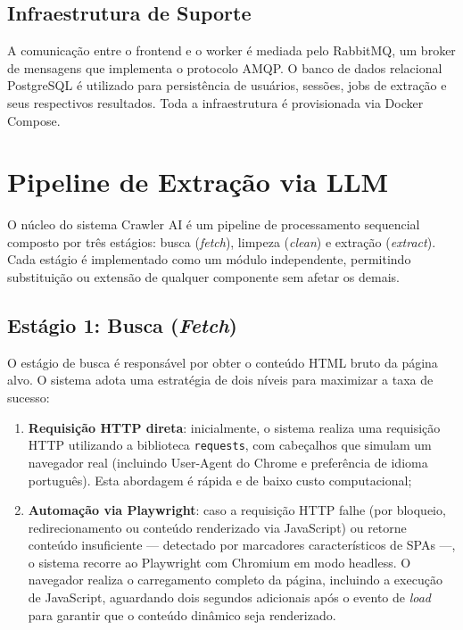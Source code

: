 \documentclass[tcc,capa]{texifsul}
\begin{document}
\subsection{Infraestrutura de Suporte}

A comunicação entre o frontend e o worker é mediada pelo RabbitMQ, um broker de mensagens que implementa o protocolo AMQP. O banco de dados relacional PostgreSQL é utilizado para persistência de usuários, sessões, jobs de extração e seus respectivos resultados. Toda a infraestrutura é provisionada via Docker Compose.

\section{Pipeline de Extração via LLM}
\label{sec:pipeline}

O núcleo do sistema Crawler AI é um pipeline de processamento sequencial composto por três estágios: busca (\textit{fetch}), limpeza (\textit{clean}) e extração (\textit{extract}). Cada estágio é implementado como um módulo independente, permitindo substituição ou extensão de qualquer componente sem afetar os demais.

\subsection{Estágio 1: Busca (\textit{Fetch})}

O estágio de busca é responsável por obter o conteúdo HTML bruto da página alvo. O sistema adota uma estratégia de dois níveis para maximizar a taxa de sucesso:

\begin{enumerate}
    \item \textbf{Requisição HTTP direta}: inicialmente, o sistema realiza uma requisição HTTP utilizando a biblioteca \texttt{requests}, com cabeçalhos que simulam um navegador real (incluindo User-Agent do Chrome e preferência de idioma português). Esta abordagem é rápida e de baixo custo computacional;
    \item \textbf{Automação via Playwright}: caso a requisição HTTP falhe (por bloqueio, redirecionamento ou conteúdo renderizado via JavaScript) ou retorne conteúdo insuficiente — detectado por marcadores característicos de SPAs —, o sistema recorre ao Playwright com Chromium em modo headless. O navegador realiza o carregamento completo da página, incluindo a execução de JavaScript, aguardando dois segundos adicionais após o evento de \textit{load} para garantir que o conteúdo dinâmico seja renderizado.
\end{enumerate}
\end{document}
